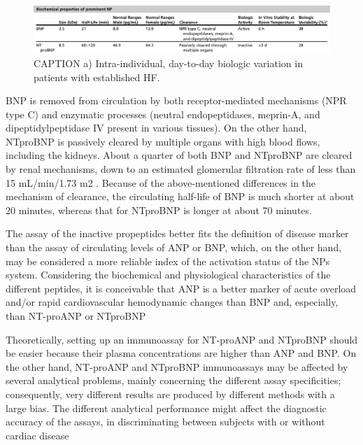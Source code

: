 \documentclass[14pt,a4paper,onecolumn]{extarticle}
\begin{document}
\begin{figure}   \includegraphics{../../images/NP_biochem.png}   \caption{CAPTION a) Intra-individual, day-to-day biologic variation in patients with established HF. \citep{Gaggin2014}}   \label{NP_biochem} \end{figure}

BNP is removed from circulation by both receptor-mediated mechanisms (NPR type C) and enzymatic processes (neutral endopeptidases, meprin-A, and dipeptidylpeptidase IV present in various tissues). On the other hand, NTproBNP is passively cleared by multiple organs with high blood flows, including the kidneys. About a quarter of both BNP and NTproBNP are cleared by renal mechanisms, down to an estimated glomerular filtration rate of less than 15 mL/min/1.73 m2 . Because of the above-mentioned differences in the mechanism of clearance, the circulating half-life of BNP is much shorter at about 20 minutes, whereas that for NTproBNP is longer at about 70 minutes. \citep{Gaggin2014}

The assay of the inactive propeptides better fits the definition of disease marker than the assay of circulating levels of ANP or BNP, which, on the other hand, may be considered a more reliable index of the activation status of the NPs system. Considering the biochemical and physiological characteristics of the different peptides, it is conceivable that ANP is a better marker of acute overload and/or rapid cardiovascular hemodynamic changes than BNP and, especially, than NT-proANP or NTproBNP \citep{bib35}%

Theoretically, setting up an immunoassay for NT-proANP and NTproBNP should be easier because their plasma concentrations are higher than ANP and BNP.  On the other hand, NT-proANP and NTproBNP immunoassays may be affected by several analytical problems, mainly concerning the different assay specificities; consequently, very different results are produced by different methods with a large bias. The different analytical performance might affect the diagnostic accuracy of the assays, in discriminating between subjects with or without cardiac disease \citep{bib35}%
\end{document}
